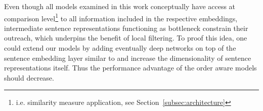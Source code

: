 
Even though all models examined in this work conceptually have access at comparison level\footnote{i.e. similarity measure application, see Section~\ref{subsec:architecture}} to all information included in the respective embeddings, intermediate sentence representations functioning as bottleneck constrain their outreach, which underpins the benefit of local filtering. To proof this idea, one could extend our models by adding eventually deep networks on top of the sentence embedding layer similar to \textcite{iyyer_deep_2015} and increase the dimensionality of sentence representations itself. Thus the performance advantage of the order aware models should decrease.

